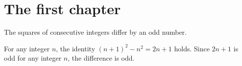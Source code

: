 %

\section{The first chapter}
\label{sec:ch1}

\begin{claim}
\label{prop:stack}
The squares of consecutive integers differ by an odd number.
\end{claim}

\begin{evidence}
\label{ev:stack}

For any integer $n$, the identity $(n+1)^2 - n^2 = 2n + 1$ holds.
Since $2n + 1$ is odd for any integer $n$, the difference is odd.
\end{evidence}
